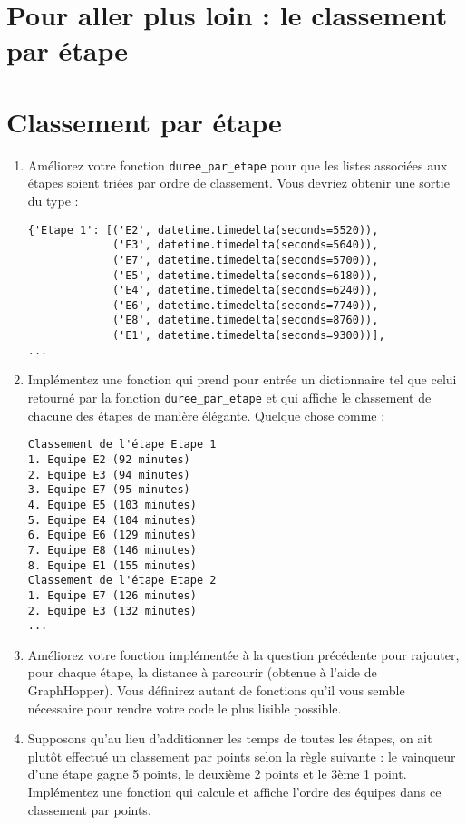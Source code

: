 \documentclass[11pt,a4paper]{article}
\begin{document}
\section{Pour aller plus loin : le classement par étape}

\section{Classement par étape}

\begin{enumerate}
    \item Améliorez votre fonction \texttt{duree\_par\_etape} pour que les listes associées aux étapes soient triées par ordre de classement. Vous devriez obtenir une sortie du type :
    \begin{verbatim}
{'Etape 1': [('E2', datetime.timedelta(seconds=5520)),
             ('E3', datetime.timedelta(seconds=5640)),
             ('E7', datetime.timedelta(seconds=5700)),
             ('E5', datetime.timedelta(seconds=6180)),
             ('E4', datetime.timedelta(seconds=6240)),
             ('E6', datetime.timedelta(seconds=7740)),
             ('E8', datetime.timedelta(seconds=8760)),
             ('E1', datetime.timedelta(seconds=9300))],
...
    \end{verbatim}
    \item Implémentez une fonction qui prend pour entrée un dictionnaire tel que celui retourné par la fonction \texttt{duree\_par\_etape} et qui affiche le classement de chacune des étapes de manière élégante. Quelque chose comme :
    \begin{verbatim}
Classement de l'étape Etape 1
1. Equipe E2 (92 minutes)
2. Equipe E3 (94 minutes)
3. Equipe E7 (95 minutes)
4. Equipe E5 (103 minutes)
5. Equipe E4 (104 minutes)
6. Equipe E6 (129 minutes)
7. Equipe E8 (146 minutes)
8. Equipe E1 (155 minutes)
Classement de l'étape Etape 2
1. Equipe E7 (126 minutes)
2. Equipe E3 (132 minutes)  
...      
    \end{verbatim}
    \item Améliorez votre fonction implémentée à la question précédente pour rajouter, pour chaque étape, la distance à parcourir (obtenue à l'aide de GraphHopper).
    Vous définirez autant de fonctions qu'il vous semble nécessaire pour rendre votre code le plus lisible possible.
    \item Supposons qu'au lieu d'additionner les temps de toutes les étapes, on ait plutôt effectué un classement par points selon la règle suivante : le vainqueur d'une étape gagne 5 points, le deuxième 2 points et le 3ème 1 point. Implémentez une fonction qui calcule et affiche l'ordre des équipes dans ce classement par points.
\end{enumerate}
\end{document}
